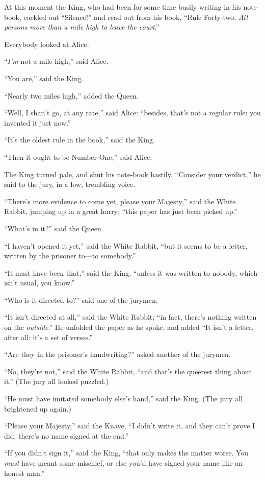 \documentclass[11pt,openany,oneside]{book}
\begin{document}
At this moment the King, who had been for some time busily writing in his note-book, cackled out “Silence!” and read out from his book, “Rule Forty-two. {\em All persons more than a mile high to leave the court\/}.” 

Everybody looked at Alice. 

“{\em I’m\/} not a mile high,” said Alice. 

“You are,” said the King. 

“Nearly two miles high,” added the Queen. 

“Well, I shan’t go, at any rate,” said Alice: “besides, that’s not a regular rule: you invented it just now.” 

“It’s the oldest rule in the book,” said the King. 

“Then it ought to be Number One,” said Alice. 

The King turned pale, and shut his note-book hastily. “Consider your verdict,” he said to the jury, in a low, trembling voice. 

“There’s more evidence to come yet, please your Majesty,” said the White Rabbit, jumping up in a great hurry; “this paper has just been picked up.” 

“What’s in it?” said the Queen. 

“I haven’t opened it yet,” said the White Rabbit, “but it seems to be a letter, written by the prisoner to—to somebody.” 

“It must have been that,” said the King, “unless it was written to nobody, which isn’t usual, you know.” 

“Who is it directed to?” said one of the jurymen. 

“It isn’t directed at all,” said the White Rabbit; “in fact, there’s nothing written on the {\em outside\/}.” He unfolded the paper as he spoke, and added “It isn’t a letter, after all: it’s a set of verses.” 

“Are they in the prisoner’s handwriting?” asked another of the jurymen. 

“No, they’re not,” said the White Rabbit, “and that’s the queerest thing about it.” (The jury all looked puzzled.) 

“He must have imitated somebody else’s hand,” said the King. (The jury all brightened up again.) 

“Please your Majesty,” said the Knave, “I didn’t write it, and they can’t prove I did: there’s no name signed at the end.” 

“If you didn’t sign it,” said the King, “that only makes the matter worse. You {\em must\/} have meant some mischief, or else you’d have signed your name like an honest man.” 
\end{document}
